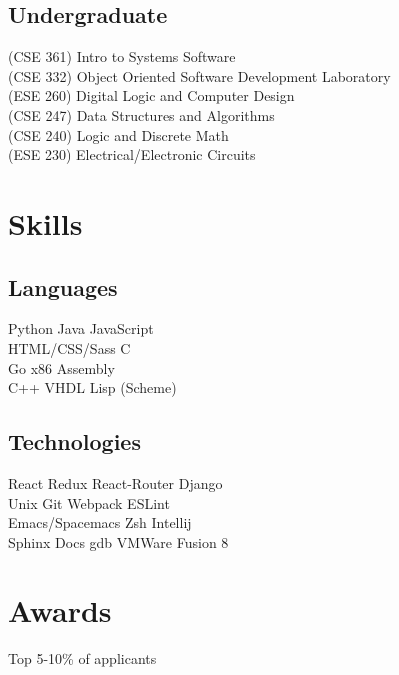 \documentclass[]{deedy-resume-openfont}
\begin{document}
\begin{minipage}[t]{0.33\textwidth}
\subsection{Undergraduate}
(CSE 361) Intro to Systems Software\\
(CSE 332) Object Oriented Software Development Laboratory\\
(ESE 260) Digital Logic and Computer Design\\
(CSE 247) Data Structures and Algorithms\\
(CSE 240) Logic and Discrete Math\\
(ESE 230) Electrical/Electronic Circuits\\
\sectionsep


\section{Skills}
\subsection{Languages}
Python \textbullet{} Java \textbullet{} JavaScript \\
HTML/CSS/Sass \textbullet{} C \\
Go \textbullet{} x86 Assembly \\
C++ \textbullet{} VHDL \textbullet{} Lisp (Scheme) \\
\sectionsep

\subsection{Technologies}
React \textbullet{} Redux \textbullet{} React-Router \textbullet{} Django \\
Unix \textbullet{} Git \textbullet{} Webpack \textbullet{} ESLint \\
Emacs/Spacemacs \textbullet{} Zsh \textbullet{} Intellij \\
Sphinx Docs \textbullet{} gdb \textbullet{} VMWare Fusion 8 \\
\sectionsep


\section{Awards}
\vspace{\topsep} %
\begin{tightemize}
\item Top 5-10\% of applicants
\end{tightemize}


\end{minipage}
\end{document}
